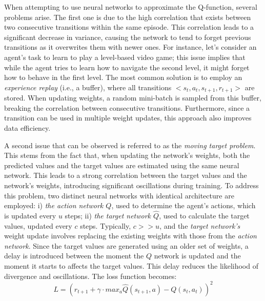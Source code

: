\documentclass[12pt,a4paper,openright,twoside]{book}
\begin{document}
When attempting to use neural networks to approximate the Q-function, several problems arise. 
    The first one is due to the high correlation that exists between two consecutive transitions within the same 
    episode. This correlation leads to a significant decrease in variance, causing the network to tend to forget 
    previous transitions as it overwrites them with newer ones. For instance, let's consider an agent's task to 
    learn to play a level-based video game; this issue implies that while the agent tries to learn how to navigate 
    the second level, it might forget how to behave in the first level. The most common solution is to employ an 
    \emph{experience replay} (i.e., a buffer), where all transitions $<s_t, a_t, s_{t+1}, r_{t+1}>$ are stored. 
    When updating weights, a random mini-batch is sampled from this buffer, breaking the correlation between consecutive
    transitions. Furthermore, since a transition can be used in multiple weight updates, this approach also 
    improves data efficiency.

A second issue that can be observed is referred to as the \emph{moving target problem}. This stems from the fact that,
    when updating the network's weights, both the predicted values and the target values are estimated using the 
    same neural network. This leads to a strong correlation between the target values and the network's weights, 
    introducing significant oscillations during training. To address this problem, two distinct neural networks 
    with identical architecture are employed: 
    i) \emph{the action network $Q$}, used to determine the agent's actions, which is updated every $u$ steps; 
    ii) \emph{the target network $\hat{Q}$}, used to calculate the target values, updated every $c$ steps. 
    Typically, $c >> u$, and the \emph{target network's} weight update involves replacing the existing weights with 
    those from the \emph{action network}.
    Since the target values are generated using an older set of weights, a delay is introduced between the 
    moment the $Q$ network is updated and the moment it starts to affects the target values.
    This delay reduces the likelihood of divergence and oscillations. The loss function becomes:
    $$ L = ( r_{t+1} + \gamma \cdot max_a \hat{Q}(s_{t+1}, a) - Q(s_t, a_t))^2 $$
\end{document}
